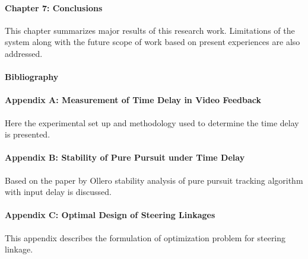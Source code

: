 \paragraph*{Chapter 7: Conclusions\\}
This chapter summarizes major results of this research work. Limitations of the system along with the future scope of work based on present experiences are also addressed.


\paragraph*{Bibliography}
\paragraph*{Appendix A:  Measurement of Time Delay in Video Feedback  \\}
Here the experimental set up and methodology used to determine the time delay is presented.
\paragraph*{Appendix B:  Stability of Pure Pursuit  under Time Delay \\}
Based on the paper by Ollero \cite{ollero1995stability} stability analysis of pure pursuit tracking algorithm with input delay is discussed.
\paragraph*{Appendix C:  Optimal Design of Steering Linkages \\} 
This appendix describes the formulation of optimization problem for steering linkage.